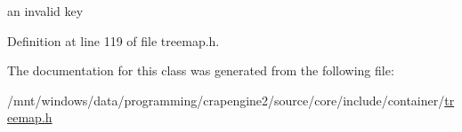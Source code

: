 an invalid key 



Definition at line 119 of file treemap.\+h.



The documentation for this class was generated from the following file\+:\begin{DoxyCompactItemize}
\item 
/mnt/windows/data/programming/crapengine2/source/core/include/container/\hyperlink{treemap_8h}{treemap.\+h}\end{DoxyCompactItemize}
